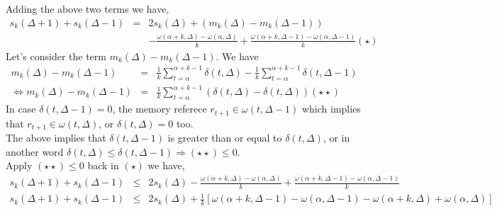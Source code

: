 Adding the above two terms we have,\\
\begin{eqnarray*}
  s_k(\Delta+1) + s_k(\Delta-1) &=& 2s_k(\Delta) + (m_k(\Delta) - m_k(\Delta-1))\\
  & & - \frac{\omega(\alpha+k,\Delta) -\omega(\alpha, \Delta)}{k}
  + \frac{\omega(\alpha+k,\Delta -1) -\omega(\alpha, \Delta-1)}{k} (\star)
\end{eqnarray*}
Let's consider the term $m_k(\Delta) - m_k(\Delta-1)$. We have
\begin{eqnarray*}
m_k(\Delta) - m_k(\Delta-1) &=& \frac{1}{k}\sum_{t=\alpha}^{\alpha+k-1}\delta(t,\Delta)
-\frac{1}{k}\sum_{t=\alpha}^{\alpha+k-1}\delta(t,\Delta-1) \\
\Leftrightarrow m_k(\Delta) - m_k(\Delta-1) &=& \frac{1}{k}\sum_{t=\alpha}^{\alpha+k-1}
(\delta(t,\Delta) - \delta(t,\Delta)) (\star \star)
\end{eqnarray*}
In case $\delta(t,\Delta-1) = 0$, the memory referece $r_{t+1} \in \omega(t,\Delta-1)$
which implies that $r_{t+1} \in \omega(t,\Delta)$, or $\delta(t,\Delta) = 0$ too.\\
The above implies that $\delta(t,\Delta-1)$ is greater than or equal to $\delta(t,\Delta)$,
or in another word $\delta(t,\Delta) \leq \delta(t,\Delta-1) \Rightarrow (\star \star) \leq 0$.\\
Apply $(\star \star) \leq 0$ back in $(\star)$ we have,\\
\begin{eqnarray*}
s_k(\Delta+1) + s_k(\Delta-1) &\leq& 2s_k(\Delta) - \frac{\omega(\alpha+k,\Delta)-\omega(\alpha,\Delta)}{k}
     + \frac{\omega(\alpha+k,\Delta -1)-\omega(\alpha,\Delta-1)}{k} \\
s_k(\Delta+1) + s_k(\Delta-1) &\leq& 2s_k(\Delta) +\frac{1}{k}[\omega(\alpha+k,\Delta-1)
     -\omega(\alpha, \Delta-1)-\omega(\alpha+k,\Delta)+\omega(\alpha,\Delta)]
\end{eqnarray*}

